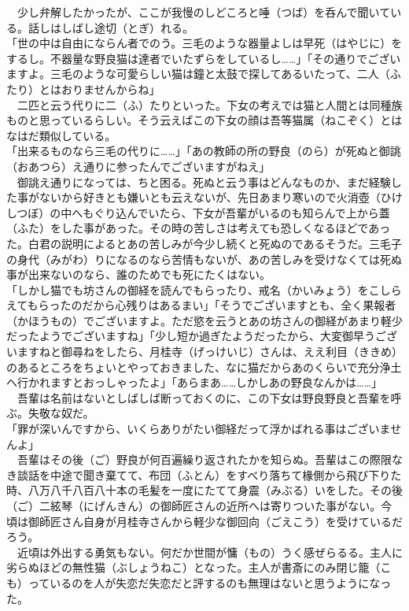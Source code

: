 　少し弁解したかったが、ここが我慢のしどころと唾（つば）を呑んで聞いている。話しはしばし途切（とぎ）れる。\\
「世の中は自由にならん者でのう。三毛のような器量よしは早死（はやじに）をするし。不器量な野良猫は達者でいたずらをしているし\ldots{}\ldots{}」「その通りでございますよ。三毛のような可愛らしい猫は鐘と太鼓で探してあるいたって、二人（ふたり）とはおりませんからね」\\
　二匹と云う代りに二（ふ）たりといった。下女の考えでは猫と人間とは同種族ものと思っているらしい。そう云えばこの下女の顔は吾等猫属（ねこぞく）とはなはだ類似している。\\
「出来るものなら三毛の代りに\ldots{}\ldots{}」「あの教師の所の野良（のら）が死ぬと御誂（おあつら）え通りに参ったんでございますがねえ」\\
　御誂え通りになっては、ちと困る。死ぬと云う事はどんなものか、まだ経験した事がないから好きとも嫌いとも云えないが、先日あまり寒いので火消壺（ひけしつぼ）の中へもぐり込んでいたら、下女が吾輩がいるのも知らんで上から蓋（ふた）をした事があった。その時の苦しさは考えても恐しくなるほどであった。白君の説明によるとあの苦しみが今少し続くと死ぬのであるそうだ。三毛子の身代（みがわ）りになるのなら苦情もないが、あの苦しみを受けなくては死ぬ事が出来ないのなら、誰のためでも死にたくはない。\\
「しかし猫でも坊さんの御経を読んでもらったり、戒名（かいみょう）をこしらえてもらったのだから心残りはあるまい」「そうでございますとも、全く果報者（かほうもの）でございますよ。ただ慾を云うとあの坊さんの御経があまり軽少だったようでございますね」「少し短か過ぎたようだったから、大変御早うございますねと御尋ねをしたら、月桂寺（げっけいじ）さんは、ええ利目（ききめ）のあるところをちょいとやっておきました、なに猫だからあのくらいで充分浄土へ行かれますとおっしゃったよ」「あらまあ\ldots{}\ldots{}しかしあの野良なんかは\ldots{}\ldots{}」\\
　吾輩は名前はないとしばしば断っておくのに、この下女は野良野良と吾輩を呼ぶ。失敬な奴だ。\\
「罪が深いんですから、いくらありがたい御経だって浮かばれる事はございませんよ」\\
　吾輩はその後（ご）野良が何百遍繰り返されたかを知らぬ。吾輩はこの際限なき談話を中途で聞き棄てて、布団（ふとん）をすべり落ちて椽側から飛び下りた時、八万八千八百八十本の毛髪を一度にたてて身震（みぶる）いをした。その後（ご）二絃琴（にげんきん）の御師匠さんの近所へは寄りついた事がない。今頃は御師匠さん自身が月桂寺さんから軽少な御回向（ごえこう）を受けているだろう。\\
　近頃は外出する勇気もない。何だか世間が慵（もの）うく感ぜらるる。主人に劣らぬほどの無性猫（ぶしょうねこ）となった。主人が書斎にのみ閉じ籠（こも）っているのを人が失恋だ失恋だと評するのも無理はないと思うようになった。\\
